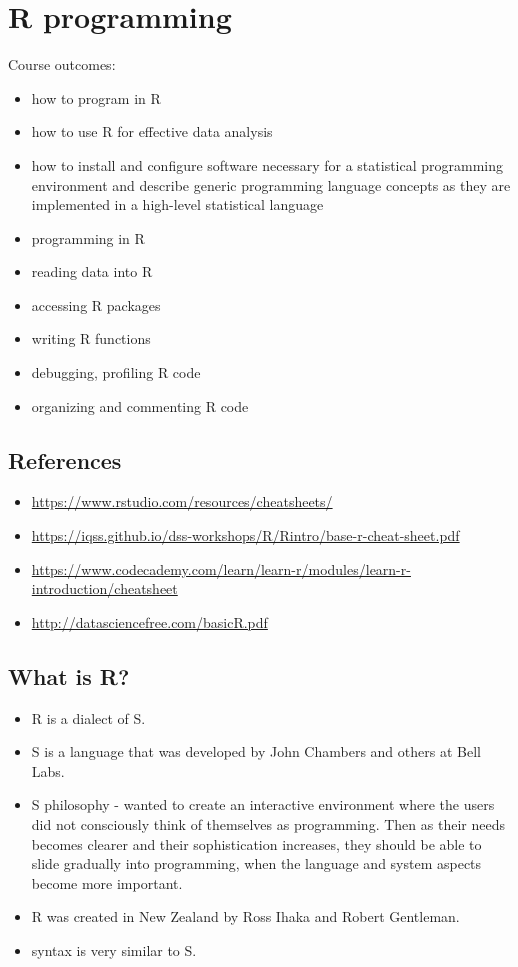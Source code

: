 \documentclass[11pt,fancy]{elegantbook}
\begin{document}
\chapter{R programming}
Course\cite{course2} outcomes:
\begin{itemize}
    \item how to program in R
    \item how to use R for effective data analysis
    \item how to install and configure software necessary for a statistical programming environment and describe generic programming language concepts as they are implemented in a high-level statistical language
    \item programming in R
    \item reading data into R
    \item accessing R packages
    \item writing R functions
    \item debugging, profiling R code
    \item organizing and commenting R code
\end{itemize}

\section{References}
\begin{itemize}
    \item \url{https://www.rstudio.com/resources/cheatsheets/}
    \item \url{https://iqss.github.io/dss-workshops/R/Rintro/base-r-cheat-sheet.pdf}
    \item \url{https://www.codecademy.com/learn/learn-r/modules/learn-r-introduction/cheatsheet}
    \item \url{http://datasciencefree.com/basicR.pdf}
\end{itemize}

\section{What is R?}
\begin{itemize}
    \item R is a dialect of S.
    \item S is a language that was developed by John Chambers and others at Bell Labs.
    \item S philosophy - wanted to create an interactive environment where the users did not consciously think of themselves as programming. Then as their needs becomes clearer and their sophistication increases, they should be able to slide gradually into programming, when the language and system aspects become more important.
    \item R was created in New Zealand by Ross Ihaka and Robert Gentleman.
    \item syntax is very similar to S.
\end{itemize}
\end{document}
